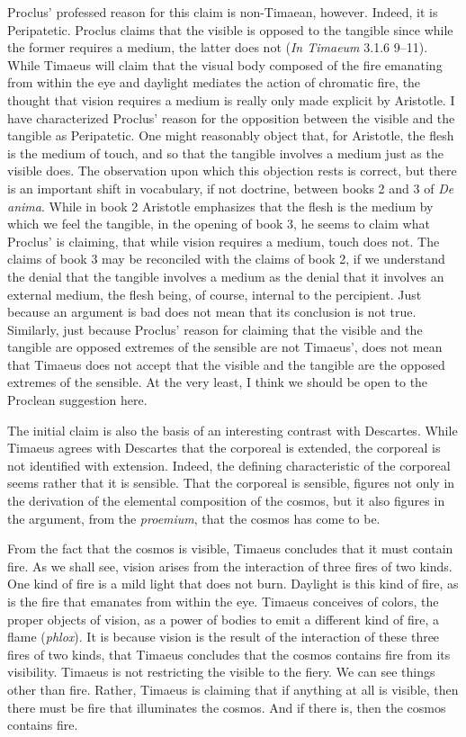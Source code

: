 Proclus' professed reason for this claim is non-Timaean, however. Indeed, it is Peripatetic. Proclus claims that the visible is opposed to the tangible since while the former requires a medium, the latter does not (\emph{In Timaeum} 3.1.6 9--11). While Timaeus will claim that the visual body composed of the fire emanating from within the eye and daylight mediates the action of chromatic fire, the thought that vision requires a medium is really only made explicit by Aristotle. I have characterized Proclus' reason for the opposition between the visible and the tangible as Peripatetic. One might reasonably object that, for Aristotle, the flesh is the medium of touch, and so that the tangible involves a medium just as the visible does. The observation upon which this objection rests is correct, but there is an important shift in vocabulary, if not doctrine, between books 2 and 3 of \emph{De anima}. While in book 2 Aristotle emphasizes that the flesh is the medium by which we feel the tangible, in the opening of book 3, he seems to claim what Proclus' is claiming, that while vision requires a medium, touch does not. The claims of book 3 may be reconciled with the claims of book 2, if we understand the denial that the tangible involves a medium as the denial that it involves an external medium, the flesh being, of course, internal to the percipient. Just because an argument is bad does not mean that its conclusion is not true. Similarly, just because Proclus' reason for claiming that the visible and the tangible are opposed extremes of the sensible are not Timaeus', does not mean that Timaeus does not accept that the visible and the tangible are the opposed extremes of the sensible. At the very least, I think we should be open to the Proclean suggestion here.

The initial claim is also the basis of an interesting contrast with Descartes. While Timaeus agrees with Descartes that the corporeal is extended, the corporeal is not identified with extension. Indeed, the defining characteristic of the corporeal seems rather that it is sensible. That the corporeal is sensible, figures not only in the derivation of the elemental composition of the cosmos, but it also figures in the argument, from the \emph{proemium}, that the cosmos has come to be.

From the fact that the cosmos is visible, Timaeus concludes that it must contain fire. As we shall see, vision arises from the interaction of three fires of two kinds. One kind of fire is a mild light that does not burn. Daylight is this kind of fire, as is the fire that emanates from within the eye. Timaeus conceives of colors, the proper objects of vision, as a power of bodies to emit a different kind of fire, a flame (\emph{phlox}). It is because vision is the result of the interaction of these three fires of two kinds, that Timaeus concludes that the cosmos contains fire from its visibility. Timaeus is not restricting the visible to the fiery. We can see things other than fire. Rather, Timaeus is claiming that if anything at all is visible, then there must be fire that illuminates the cosmos. And if there is, then the cosmos contains fire.

